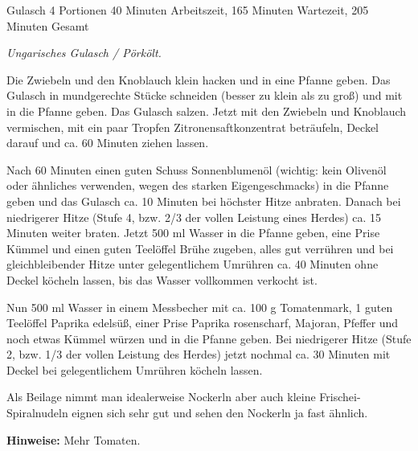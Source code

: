 \begin{recipe}{Gulasch} {4 Portionen} {40 Minuten Arbeitszeit, 165 Minuten Wartezeit, 205 Minuten Gesamt}

  \freeform
  \textit{Ungarisches Gulasch / Pörkölt.}


  Die Zwiebeln und den Knoblauch klein hacken und in eine Pfanne geben.
  Das Gulasch in mundgerechte Stücke schneiden (besser zu klein als zu groß) und mit in die Pfanne geben.
  Das Gulasch salzen.
  Jetzt mit den Zwiebeln und Knoblauch vermischen, mit ein paar Tropfen Zitronensaftkonzentrat beträufeln, Deckel darauf und ca. 60 Minuten ziehen lassen.

  Nach 60 Minuten einen guten Schuss Sonnenblumenöl (wichtig: kein Olivenöl oder ähnliches verwenden, wegen des starken Eigengeschmacks) in die Pfanne geben und das Gulasch ca. 10 Minuten bei höchster Hitze anbraten.
  Danach bei niedrigerer Hitze (Stufe 4, bzw. 2/3 der vollen Leistung eines Herdes) ca. 15 Minuten weiter braten.
  Jetzt 500 ml Wasser in die Pfanne geben, eine Prise Kümmel und einen guten Teelöffel Brühe zugeben, alles gut verrühren und bei gleichbleibender Hitze unter gelegentlichem Umrühren ca. 40 Minuten ohne Deckel köcheln lassen, bis das Wasser vollkommen verkocht ist.

  Nun 500 ml Wasser in einem Messbecher mit ca. 100 g Tomatenmark, 1 guten Teelöffel Paprika edelsüß, einer Prise Paprika rosenscharf, Majoran, Pfeffer und noch etwas Kümmel würzen und in die Pfanne geben.
  Bei niedrigerer Hitze (Stufe 2, bzw. 1/3 der vollen Leistung des Herdes) jetzt nochmal ca. 30 Minuten mit Deckel bei gelegentlichem Umrühren köcheln lassen.

  Als Beilage nimmt man idealerweise Nockerln aber auch kleine Frischei-Spiralnudeln eignen sich sehr gut und sehen den Nockerln ja fast ähnlich.

  \freeform
  \hrulefill

  \freeform
  \textbf{Hinweise:}
  Mehr Tomaten.

  \end{recipe}
